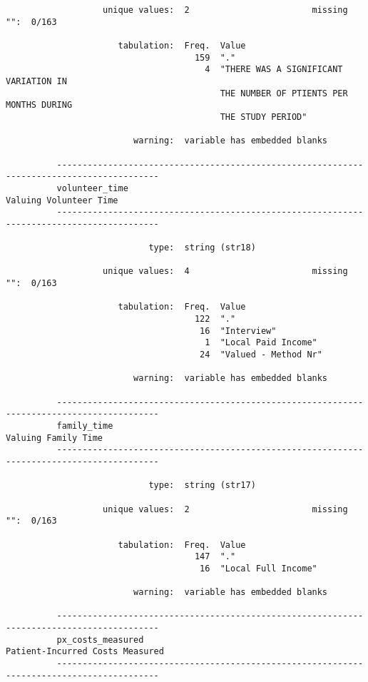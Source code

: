 \documentclass{article}
\begin{document}
\begin{verbatim}
                   unique values:  2                        missing "":  0/163
          
                      tabulation:  Freq.  Value
                                     159  "."
                                       4  "THERE WAS A SIGNIFICANT VARIATION IN
                                          THE NUMBER OF PTIENTS PER MONTHS DURING
                                          THE STUDY PERIOD"
          
                         warning:  variable has embedded blanks
          
          ------------------------------------------------------------------------------------------
          volunteer_time                                                      Valuing Volunteer Time
          ------------------------------------------------------------------------------------------
          
                            type:  string (str18)
          
                   unique values:  4                        missing "":  0/163
          
                      tabulation:  Freq.  Value
                                     122  "."
                                      16  "Interview"
                                       1  "Local Paid Income"
                                      24  "Valued - Method Nr"
          
                         warning:  variable has embedded blanks
          
          ------------------------------------------------------------------------------------------
          family_time                                                            Valuing Family Time
          ------------------------------------------------------------------------------------------
          
                            type:  string (str17)
          
                   unique values:  2                        missing "":  0/163
          
                      tabulation:  Freq.  Value
                                     147  "."
                                      16  "Local Full Income"
          
                         warning:  variable has embedded blanks
          
          ------------------------------------------------------------------------------------------
          px_costs_measured                                          Patient-Incurred Costs Measured
          ------------------------------------------------------------------------------------------
          

\end{verbatim}
\end{document}
